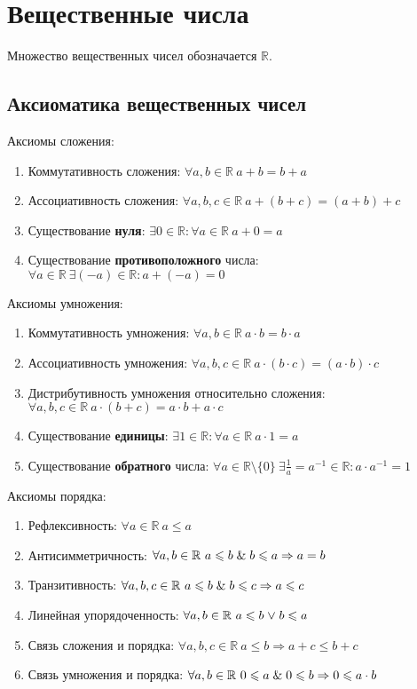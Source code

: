 \section{Вещественные числа}
  Множество вещественных чисел обозначается $\mathbb R$.

\subsection{Аксиоматика вещественных чисел}
Аксиомы сложения:
\begin{enumerate}
	\item Коммутативность сложения: $\forall a, b \in \mathbb R \ a + b = b + a$
	\item Ассоциативность сложения: $\forall a, b, c \in \mathbb R \ a + (b + c) = (a + b) + c$
	\item Существование \textbf{нуля}: $\exists 0 \in \mathbb R \colon \forall a \in \mathbb R \ a + 0 = a$
	\item Существование \textbf{противоположного} числа: $\forall a \in \mathbb R \ \exists (-a) \in \mathbb R \colon a + (-a) = 0$
\end{enumerate}

Аксиомы умножения:
\begin{enumerate}
	\item Коммутативность умножения: $\forall a, b \in \mathbb R \ a \cdot b = b \cdot a$
	\item Ассоциативность умножения: $\forall a, b, c \in \mathbb R \ a \cdot (b \cdot c) = (a \cdot b) \cdot c$
	\item Дистрибутивность умножения относительно сложения: $\forall a, b, c \in \mathbb R \ a \cdot (b + c) = a \cdot b + a \cdot c$
	\item Существование \textbf{единицы}: $\exists 1 \in \mathbb R \colon \forall a \in \mathbb R \ a \cdot 1 = a$
	\item Существование \textbf{обратного} числа: $\forall a \in \mathbb R \setminus \{ 0 \} \ \exists \frac1a = a^{-1} \in \mathbb R \colon a \cdot a^{-1} = 1$
\end{enumerate}

Аксиомы порядка:
\begin{enumerate}
	\item Рефлексивность: $\forall a \in \mathbb R \ a \leqslant a$
	\item Антисимметричность: $\forall a, b \in \mathbb R \ a \leqslant b \mathrel{\&} b \leqslant a \Rightarrow a = b$
	\item Транзитивность: $\forall a, b, c \in \mathbb R \ a \leqslant b \mathrel{\&} b \leqslant c \Rightarrow a \leqslant c$
	\item Линейная упорядоченность: $\forall a, b \in \mathbb R \ a \leqslant b \mathrel{\lor} b \leqslant a$
	\item Связь сложения и порядка: $\forall a, b, c \in \mathbb R \ a \leqslant b \Rightarrow a + c \leqslant b + c$
	\item Связь умножения и порядка: $\forall a, b \in \mathbb R \ 0 \leqslant a \mathrel{\&} 0 \leqslant b \Rightarrow 0 \leqslant a \cdot b$
\end{enumerate}

